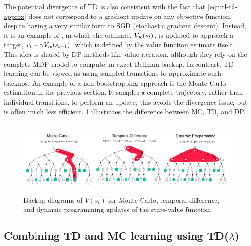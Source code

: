 The potential divergence of TD is also consistent with
the fact that \cref{eqn:rl-td-approx} does not correspond
to a gradient update
on any objective function, despite having
a very similar form to SGD (stochastic gradient descent).
Instead, it is an example of ,
in which the estimate, $V_{{\bm{w}}}(s_t)$,
is updated to approach a target,
$r_t + \gamma V_{{\bm{w}}}(s_{t+1})$,
which is defined by the value function estimate itself.
This idea is shared by DP methods
like value iteration, although they rely on the
complete MDP model to compute an exact Bellman backup.
In contrast, TD learning can be viewed as using
sampled transitions to approximate such backups.
An example of a non-bootstrapping approach is the
Monte Carlo estimation in the previous section.
It samples a complete trajectory,
rather than individual transitions,
to perform an update;
this avoids the divergence issue,
but is  often much less
efficient.
\cref{fig:TD-MC-DP} illustrates the difference between
MC, TD, and DP.

\begin{figure}
\centering
\includegraphics[height=1.5in]{figs/TD-MC-DP-backups}
\caption{
  Backup diagrams of $V(s_t)$ for Monte Carlo,
  temporal difference, and dynamic programming
  updates of the state-value function.
.
}
\label{fig:TD-MC-DP}
\end{figure}



\subsection{Combining TD and MC learning using TD($\lambda$)}
\label{sec:TDlambda}
\label{sec:nstep}

